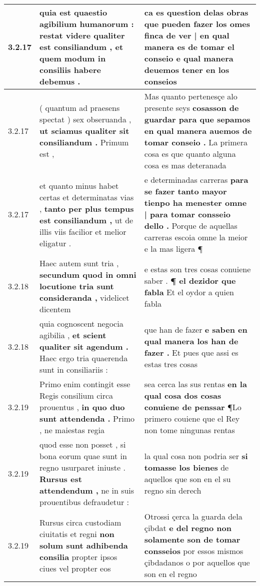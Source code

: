 \begin{tabular}{|p{1cm}|p{6.5cm}|p{6.5cm}|}
3.2.17 & quia est quaestio agibilium humanorum : \textbf{ restat videre qualiter est consiliandum , } et quem modum in consiliis habere debemus . & ca es question delas obras \textbf{ que pueden fazer los omes finca de ver | en qual manera es de tomar el conseio } e qual manera deuemos tener en los conseios \\\hline
3.2.17 & ( quantum ad praesens spectat ) sex obseruanda , \textbf{ ut sciamus qualiter sit consiliandum . } Primum est , & Mas quanto pertenesçe alo presente seys \textbf{ cosasson de guardar para que sepamos en qual manera auemos de tomar conseio . } La primera cosa es que quanto alguna cosa es mas deteranada \\\hline
3.2.17 & et quanto minus habet certas et determinatas vias , \textbf{ tanto per plus tempus est consiliandum , } ut de illis viis facilior et melior eligatur . & e determinadas carreras \textbf{ para se fazer tanto mayor tienpo ha menester omne | para tomar consseio dello . } Porque de aquellas carreras escoia omne la meior e la mas ligera ¶ \\\hline
3.2.18 & Haec autem sunt tria , \textbf{ secundum quod in omni locutione tria sunt consideranda , } videlicet dicentem & e estas son tres cosas conuiene saber . \textbf{ ¶ el dezidor que fabla } Et el oydor a quien fabla \\\hline
3.2.18 & quia cognoscent negocia agibilia , \textbf{ et scient qualiter sit agendum . } Haec ergo tria quaerenda sunt in consiliariis : & que han de fazer \textbf{ e saben en qual manera los han de fazer . } Et pues que assi es estas tres cosas \\\hline
3.2.19 & Primo enim contingit esse Regis consilium circa prouentus , \textbf{ in quo duo sunt attendenda . } Primo , ne maiestas regia & sea cerca las sus rentas \textbf{ en la qual cosa dos cosas conuiene de penssar } ¶Lo primero couiene que el Rey non tome ningunas rentas \\\hline
3.2.19 & quod esse non posset , si bona eorum quae sunt in regno usurparet iniuste . \textbf{ Rursus est attendendum , } ne in suis prouentibus defraudetur : & la qual cosa non podria ser \textbf{ si tomasse los bienes } de aquellos que son en el su regno sin derech \\\hline
3.2.19 & Rursus circa custodiam ciuitatis et regni \textbf{ non solum sunt adhibenda consilia } propter ipsos ciues vel propter eos & Otrossi çerca la guarda dela çibdat \textbf{ e del regno non solamente son de tomar consseios } por essos mismos çibdadanos o por aquellos que son en el regno \\\hline

\end{tabular}

